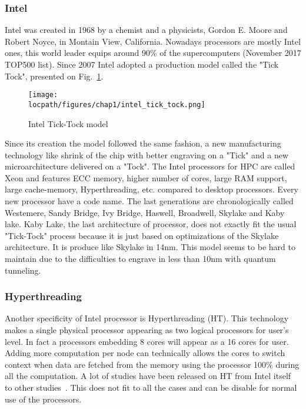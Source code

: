 \subsubsection{Intel}

Intel was created in 1968 by a chemist and a physicists, Gordon E. Moore and Robert Noyce, in Montain View, California. 
Nowadays processors are mostly Intel ones, this world leader equips around 90\% of the supercomputers (November 2017 TOP500 list).
Since 2007 Intel adopted a production model called the "Tick Tock", presented on Fig.~\ref{fig:1_HPC:intel_tick_tock}.

\begin{figure}
\begin{center}
\texttt{[image: \\locpath/figures/chap1/intel\_tick\_tock.png]}
\caption{Intel Tick-Tock model}
\label{fig:1_HPC:intel_tick_tock}
\end{center}
\end{figure}

Since its creation the model followed the same fashion, a new manufacturing technology like shrink of the chip with better engraving on a "Tick" and a new microarchitecture delivered on a "Tock".
The Intel processors for HPC are called Xeon and features ECC memory, higher number of cores, large RAM support, large cache-memory, Hyperthreading, etc. compared to desktop processors. 
Every new processor have a code name. 
The last generations are chronologically called Westemere, Sandy Bridge, Ivy Bridge, Haswell, Broadwell, Skylake and Kaby lake. 
Kaby Lake, the last architecture of processor, does not exactly fit the usual "Tick-Tock" process because it is just based on optimizations of the Skylake architecture. 
It is produce like Skylake in 14nm.
This model seems to be hard to maintain due to the difficulties to engrave in less than 10nm with quantum tunneling. 

\subsubsection{Hyperthreading}
Another specificity of Intel processor is Hyperthreading (HT). 
This technology makes a single physical processor appearing as two logical processors for user's level.
In fact a processors embedding 8 cores will appear as a 16 cores for user. 
Adding more computation per node can technically allows the cores to switch context when data are fetched from the memory using the processor 100\% during all the computation. 
A lot of studies have been released on HT from Intel itself~\cite{marr2002hyperthreading} to other studies~\cite{bononi2006exploring,leng2002empirical}.
This does not fit to all the cases and can be disable for normal use of the processors. 

